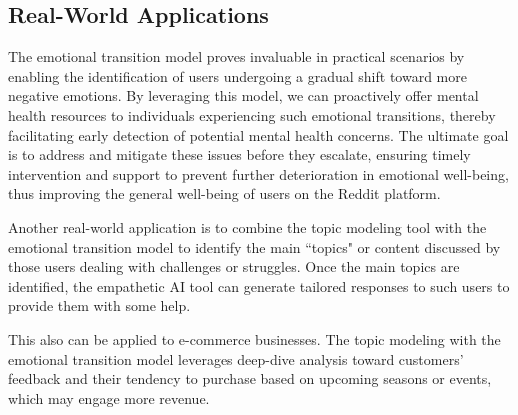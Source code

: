 \documentclass[conference,compsoc]{IEEEtran}
\begin{document}
\subsection{Real-World Applications}
The emotional transition model proves invaluable in practical scenarios by enabling the identification of users undergoing a gradual shift toward more negative emotions. By leveraging this model, we can proactively offer mental health resources to individuals experiencing such emotional transitions, thereby facilitating early detection of potential mental health concerns. The ultimate goal is to address and mitigate these issues before they escalate, ensuring timely intervention and support to prevent further deterioration in emotional well-being, thus improving the general well-being of users on the Reddit platform. 

Another real-world application is to combine the topic modeling tool with the emotional transition model to identify the main ``topics" or content discussed by those users dealing with challenges or struggles. Once the main topics are identified, the empathetic AI tool can generate tailored responses to such users to provide them with some help. 

This also can be applied to e-commerce businesses. The topic modeling with the emotional transition model leverages deep-dive analysis toward customers' feedback and their tendency to purchase based on upcoming seasons or events, which may engage more revenue.






\renewcommand{\thetable}{\Alph{section}.\arabic{table}}
\setcounter{table}{0}
\end{document}
